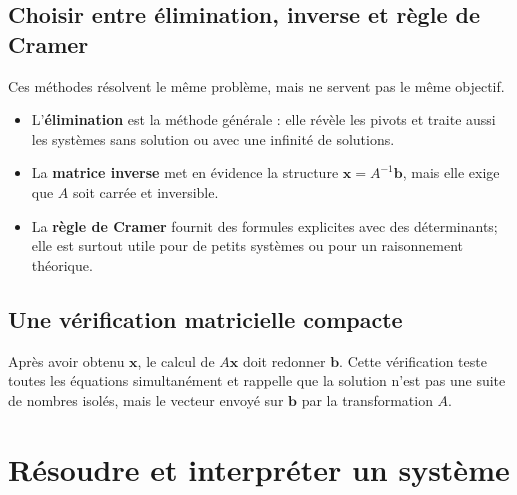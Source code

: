 \documentclass[12pt,a4paper,openany]{book}
\begin{document}
\subsection{Choisir entre élimination, inverse et règle de Cramer}
Ces méthodes résolvent le même problème, mais ne servent pas le même objectif.
\begin{itemize}
\item L'\textbf{élimination} est la méthode générale : elle révèle les pivots et traite aussi les systèmes sans solution ou avec une infinité de solutions.
\item La \textbf{matrice inverse} met en évidence la structure $\mathbf x=A^{-1}\mathbf b$, mais elle exige que $A$ soit carrée et inversible.
\item La \textbf{règle de Cramer} fournit des formules explicites avec des déterminants; elle est surtout utile pour de petits systèmes ou pour un raisonnement théorique.
\end{itemize}

\begin{center}
\end{center}

\subsection{Une vérification matricielle compacte}
Après avoir obtenu $\mathbf x$, le calcul de $A\mathbf x$ doit redonner $\mathbf b$. Cette vérification teste toutes les équations simultanément et rappelle que la solution n'est pas une suite de nombres isolés, mais le vecteur envoyé sur $\mathbf b$ par la transformation $A$.


\section{Résoudre et interpréter un système}
\end{document}
